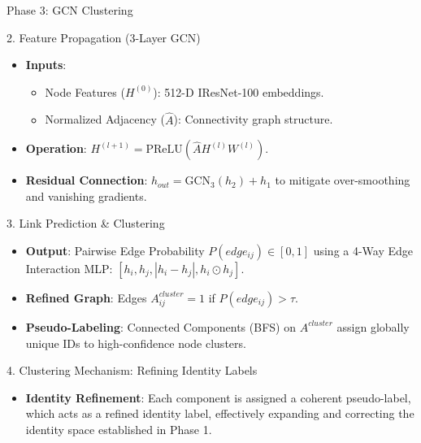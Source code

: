 \documentclass[t]{beamer}
\begin{document}
\begin{frame}[allowframebreaks]{Phase 3: GCN Clustering}
    \begin{block}{2. Feature Propagation (3-Layer GCN)}
        \begin{itemize}
            \item \textbf{Inputs}:
                \begin{itemize}
                    \item Node Features ($H^{(0)}$): 512-D IResNet-100 embeddings.
                    \item Normalized Adjacency ($\hat{A}$): Connectivity graph structure.
                \end{itemize}
            \item \textbf{Operation}: $H^{(l+1)} = \text{PReLU}(\hat{A} H^{(l)} W^{(l)})$.
            \item \textbf{Residual Connection}: $h_{out} = \text{GCN}_3(h_2) + h_1$ to mitigate over-smoothing and vanishing gradients.
        \end{itemize}
    \end{block}

    \begin{block}{3. Link Prediction & Clustering}
        \begin{itemize}
            \item \textbf{Output}: Pairwise Edge Probability $P(edge_{ij}) \in [0, 1]$ using a 4-Way Edge Interaction MLP: $[h_i, h_j, |h_i-h_j|, h_i \odot h_j]$.
            \item \textbf{Refined Graph}: Edges $A^{cluster}_{ij} = 1$ if $P(edge_{ij}) > \tau$.
            \item \textbf{Pseudo-Labeling}: Connected Components (BFS) on $A^{cluster}$ assign globally unique IDs to high-confidence node clusters.
        \end{itemize}
    \end{block}

    \begin{block}{4. Clustering Mechanism: Refining Identity Labels}
        \begin{itemize}
            \item \textbf{Identity Refinement}: Each component is assigned a coherent pseudo-label, which acts as a refined identity label, effectively expanding and correcting the identity space established in Phase 1.
        \end{itemize}
    \end{block}
\end{frame}

\end{document}
